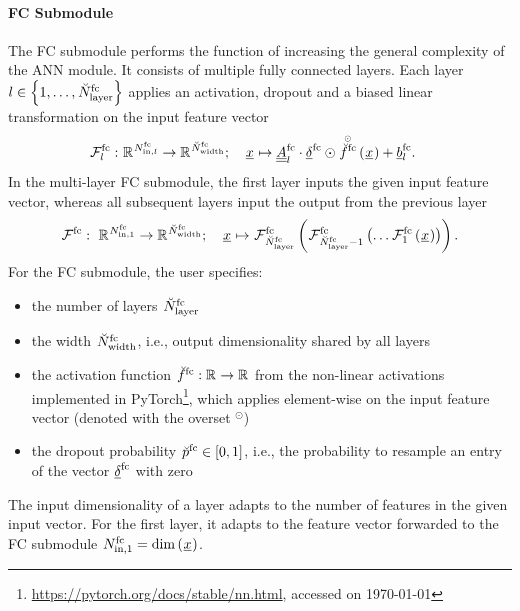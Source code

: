 \paragraph*{FC Submodule}$\ $\\
The FC submodule performs the function
of increasing the general complexity of the ANN module.
It consists of multiple fully connected layers.
Each layer 
$ l \in \setOfInts{1, \dots, \fcLayer}$ 
applies
an activation, 
dropout
and a biased linear transformation
on the input feature vector
\begin{align} \label{eq:fc_layer}
    \fcMap{l}
    :\ &
    \R{\fcIn{l}} \rightarrow \R{\fcOut}
    ;\quad 
    \featvec[]{}{}{}{} \mapsto
    \fcMat{l} \cdot \fcDropout \odot
    \hadfct{\fcAct} \left(\featvec[]{}{}{}{}\right)
    + \fcBias{l}
    .
\end{align}
In the multi-layer FC submodule, the first layer inputs 
the given input feature vector,
whereas all subsequent layers input the output from the previous layer
\begin{align} \label{eq:fc}
    \fcMap{}
    :\
    \R{\fcIn{1}} \rightarrow \R{\fcOut}
    ;\quad 
    \featvec[]{}{}{}{} \mapsto
    \fcMap{\fcLayer} \tuple{
        \fcMap{\fcLayer - 1} \tuple{
            \dots \fcMap{1} \tuple{
                \featvec[]{}{}{}{}
            }
        }    
    }
    .
\end{align}
For the FC submodule,
the user specifies:
\begin{itemize}
    \item the number of layers $\fcLayer$
    \item the width $\fcOut$, i.e., output dimensionality shared by all layers
    \item the activation function $\fcAct : \R{} \rightarrow \R{}$
    from the non-linear activations implemented in PyTorch\footnote{
        \url{https://pytorch.org/docs/stable/nn.html}, accessed on \today
    },
    which applies element-wise on the input feature vector (denoted with the overset ${}^\odot$)
    \item the dropout probability $\fcDropoutProb \in \setR{0,1}$,
    i.e., the probability to resample an entry of the vector 
    $\fcDropout$ with zero
    
    
\end{itemize}
The input dimensionality of a layer
adapts to the number of features in the given input vector.
For the first layer, it adapts to the feature vector
forwarded to the FC submodule
$\fcIn{1} = \dim \left(\featvec[]{}{}{}{}\right)$.
